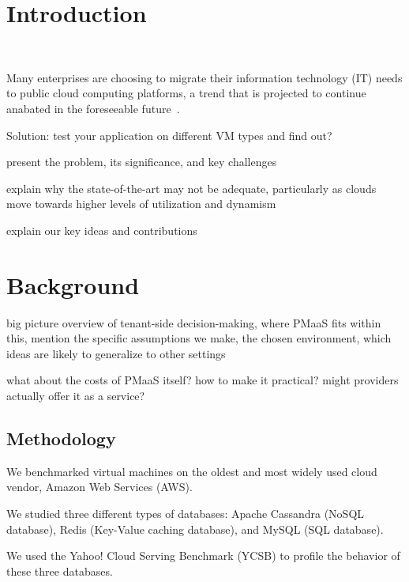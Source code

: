 \documentclass{acm_proc_article-sp}
\newcommand{\bu}[1]{{\color{red}#1}}
\begin{document}

\section{Introduction}


~\bu{Many enterprises are choosing to migrate their information technology (IT) needs to public cloud computing platforms, a trend that is projected to continue anabated in the foreseeable future~\cite{xxx}. 

}


Solution: test your application on different VM types and find out?

present the problem, its significance, and key challenges
 
explain why the state-of-the-art may not be adequate, particularly as clouds move towards higher levels of utilization and dynamism

explain our key ideas and contributions

\section{Background}
big picture overview of tenant-side decision-making, where PMaaS fits within this, mention the specific assumptions we make, the chosen environment, which ideas are likely to generalize to other settings
 
what about the costs of PMaaS itself? how to make it practical? might providers actually offer it as a service?

\subsection{Methodology}

We benchmarked virtual machines on the oldest and most widely used cloud vendor, Amazon Web Services (AWS).

We studied three different types of databases: Apache Cassandra (NoSQL database), Redis (Key-Value caching database), and MySQL (SQL database).

We used the Yahoo! Cloud Serving Benchmark (YCSB) to profile the behavior of these three databases.
\end{document}
